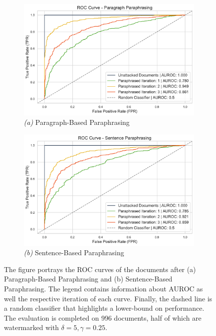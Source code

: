 \documentclass{l4proj}
\theoremstyle{definition}
\begin{document}
    \begin{figure}[ht]
        \centering
        \captionsetup[subfigure]{labelformat=empty}
        \begin{subfigure}{.495\textwidth}
            \centering
            \includegraphics[width=\linewidth]{images/results/roc/roc-curve-para.pdf}
            \caption{\emph{(a)} Paragraph-Based Paraphrasing}
            \label{fig:para-roc}
        \end{subfigure}
        \begin{subfigure}{.495\textwidth}
            \centering
            \includegraphics[width=\linewidth]{images/results/roc/roc-curve-sent.pdf}
            \caption{\emph{(b)} Sentence-Based Paraphrasing}
            \label{fig:sent-roc}
        \end{subfigure}
        \caption{The figure portrays the ROC curves of the documents after (a) Paragraph-Based Paraphrasing and (b) Sentence-Based Paraphrasing. The legend contains information about AUROC as well the respective iteration of each curve. Finally, the dashed line is a random classifier that highlights a lower-bound on performance. The evaluation is completed on 996 documents, half of which are watermarked with $\delta = 5, \gamma = 0.25$.}
        \label{fig:roc-para-sent-comparison}
    \end{figure}
\end{document}

